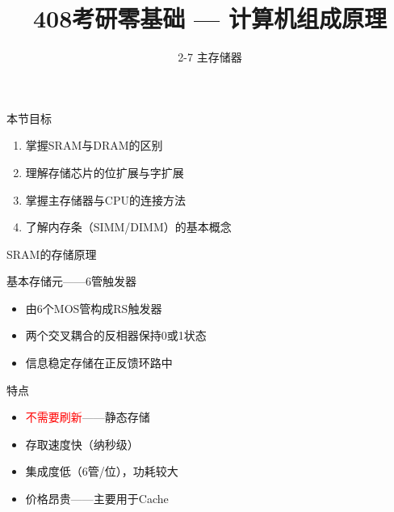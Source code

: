 \documentclass[10pt, aspectratio=169]{beamer}
\title{408考研零基础 --- 计算机组成原理}
\subtitle{2-7 主存储器}
\author{}
\date{}
\begin{document}
\begin{frame}{本节目标}
    \begin{enumerate}
        \item 掌握SRAM与DRAM的区别
        \item 理解存储芯片的位扩展与字扩展
        \item 掌握主存储器与CPU的连接方法
        \item 了解内存条（SIMM/DIMM）的基本概念
    \end{enumerate}
\end{frame}

\begin{frame}[t]{SRAM的存储原理}
    \begin{block}{基本存储元——6管触发器}
        \begin{itemize}
            \item 由6个MOS管构成RS触发器
            \item 两个交叉耦合的反相器保持0或1状态
            \item 信息稳定存储在正反馈环路中
        \end{itemize}
    \end{block}
    \vspace{0.3em}
    \begin{block}{特点}
        \begin{itemize}
            \item \textcolor{red}{不需要刷新}——静态存储
            \item 存取速度快（纳秒级）
            \item 集成度低（6管/位），功耗较大
            \item 价格昂贵——主要用于Cache
        \end{itemize}
    \end{block}
\end{frame}
\end{document}
